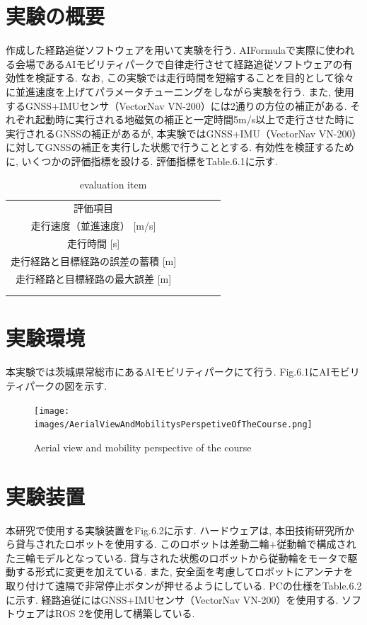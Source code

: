 
\section{実験の概要}
作成した経路追従ソフトウェアを用いて実験を行う.
AIFormulaで実際に使われる会場であるAIモビリティパークで自律走行させて経路追従ソフトウェアの有効性を検証する.
なお, この実験では走行時間を短縮することを目的として徐々に並進速度を上げてパラメータチューニングをしながら実験を行う.
また, 使用するGNSS+IMUセンサ（VectorNav VN-200）には2通りの方位の補正がある.
それぞれ起動時に実行される地磁気の補正と一定時間5m/s以上で走行させた時に実行されるGNSSの補正があるが,
本実験ではGNSS+IMU（VectorNav VN-200）に対してGNSSの補正を実行した状態で行うこととする.
有効性を検証するために, いくつかの評価指標を設ける.
評価指標をTable.6.1に示す.

\begin{table}[H]
  \centering
  \caption{evaluation item}
  \begin{tabular}{cclll}
  \cline{1-1}
  評価項目                    &  &  &  &  \\
  \cline{1-2}
  走行速度（並進速度） {[}m/s{]}    &  &  &  &  \\
  走行時間 {[}s{]}            &  &  &  &  \\
  走行経路と目標経路の誤差の蓄積 {[}m{]} &  &  &  &  \\
  走行経路と目標経路の最大誤差 {[}m{]}  &  &  &  &  \\
  \multicolumn{1}{l}{}    &  &  &  &  \\
  \multicolumn{1}{l}{}    &  &  &  & 
  \end{tabular}
\end{table}

\section{実験環境}
本実験では茨城県常総市にあるAIモビリティパークにて行う.
Fig.6.1にAIモビリティパークの図を示す.

\begin{figure}[H]
  \centering
 \texttt{[image: images/AerialViewAndMobilitysPerspetiveOfTheCourse.png]}
 \caption{Aerial view and mobility perspective of the course}
 \label{fig:course}
\end{figure}

\section{実験装置}
本研究で使用する実験装置をFig.6.2に示す.
ハードウェアは, 本田技術研究所から貸与されたロボットを使用する.
このロボットは差動二輪+従動輪で構成された三輪モデルとなっている.
貸与された状態のロボットから従動輪をモータで駆動する形式に変更を加えている.
また, 安全面を考慮してロボットにアンテナを取り付けて遠隔で非常停止ボタンが押せるようにしている.
PCの仕様をTable.6.2に示す.
経路追従にはGNSS+IMUセンサ（VectorNav VN-200）を使用する.
ソフトウェアはROS 2を使用して構築している.


